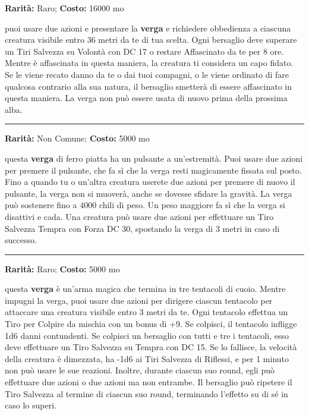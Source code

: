 \begin{multicols}{2}
\textbf{Rarità:} Raro; \textbf{Costo:} 16000 mo

puoi usare due azioni e presentare la \textbf{verga} e richiedere obbedienza a ciascuna creatura visibile entro 36 metri da te di tua scelta. Ogni bersaglio deve superare un Tiri Salvezza su Volontà con DC 17 o restare Affascinato da te per 8 ore. Mentre è affascinata in questa maniera, la creatura ti considera un capo fidato. Se le viene recato danno da te o dai tuoi compagni, o le viene ordinato di fare qualcosa contrario alla sua natura, il bersaglio smetterà di essere affascinato in questa maniera. La verga non può essere usata di nuovo prima della prossima alba.

\smallskip\noindent\rule{\linewidth}{2pt}  \hypertarget{VergaInamovibile}{}\smallskip{}\noindent\label{VergaInamovibile}

\textbf{Rarità:} Non Comune; \textbf{Costo:} 5000 mo

questa \textbf{verga} di ferro piatta ha un pulsante a un'estremità. Puoi usare due azioni per premere il pulsante, che fa sì che la verga resti magicamente fissata sul posto. Fino a quando tu o un'altra creatura userete due azioni per premere di nuovo il pulsante, la verga non si muoverà, anche se dovesse sfidare la gravità. La verga può sostenere fino a 4000 chili di peso. Un peso maggiore fa sì che la verga si disattivi e cada. Una creatura può usare due azioni per effettuare un Tiro Salvezza Tempra con Forza DC 30, spostando la verga di 3 metri in caso di successo.

\smallskip\noindent\rule{\linewidth}{2pt}  \hypertarget{VergaTentacolare}{}\smallskip{}\noindent\label{VergaTentacolare}

\textbf{Rarità:} Raro; \textbf{Costo:} 5000 mo

questa \textbf{verga} è un'arma magica che termina in tre tentacoli di cuoio. Mentre impugni la verga, puoi usare due azioni per dirigere ciascun tentacolo per attaccare una creatura visibile entro 3 metri da te. Ogni tentacolo effettua un Tiro per Colpire da mischia con un bonus di +9. Se colpisci, il tentacolo infligge 1d6 danni contundenti. Se colpisci un bersaglio con tutti e tre i tentacoli, esso deve effettuare un Tiro Salvezza su Tempra con DC 15. Se lo fallisce, la velocità della creatura è dimezzata, ha -1d6 ai Tiri Salvezza di Riflessi, e per 1 minuto non può usare le sue reazioni. Inoltre, durante ciascun suo round, egli può effettuare due azioni o due azioni ma non entrambe. Il bersaglio può ripetere il Tiro Salvezza al termine di ciascun suo round, terminando l'effetto su di sé in caso lo superi.


\end{multicols}
